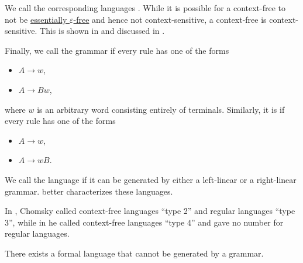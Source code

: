 \begin{definition}
\begin{thmenum}
    We call the corresponding languages . While it is possible for a context-free  to not be \hyperref[def:epsilon_free_grammar]{essentially \( \varepsilon \)-free} and hence not context-sensitive, a context-free  is context-sensitive. This is shown in  and discussed in .

     Finally, we call the grammar  if every rule has one of the forms
    \begin{itemize}
      \item \( A \to w \),
      \item \( A \to B w \),
    \end{itemize}
    where \( w \) is an arbitrary word consisting entirely of terminals. Similarly, it is  if every rule has one of the forms
    \begin{itemize}
      \item \( A \to w \),
      \item \( A \to w B \).
    \end{itemize}

    We call the language  if it can be generated by either a left-linear or a right-linear grammar.  better characterizes these languages.
  \end{thmenum}
\end{definition}
\begin{comments}
  \item In \cite[142]{Chomsky1959}, Chomsky called context-free languages \enquote{type 2} and regular languages \enquote{type 3}, while in \cite[366]{MathPsychology1963Vol2} he called context-free languages \enquote{type 4} and gave no number for regular languages.
\end{comments}

\begin{proposition}\label{thm:non_recursively_enumerable_language}
  There exists a formal language that cannot be generated by a grammar.
\end{proposition}

